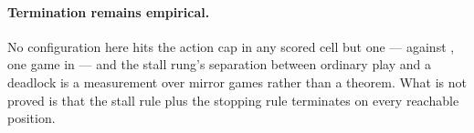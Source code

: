 \paragraph{Termination remains empirical.}
No configuration here hits the action cap in any scored cell but one --- \vsevenLimitCellArm{}
against \texttt{\vsevenLimitCellOpp{}}, one game in \vsevenLimitCellGames{} --- and the
stall rung's separation between ordinary play and a deadlock is a measurement over
\vsevenStallMirrorGames{} mirror games rather than a theorem.
What is not proved is that the stall rule plus the stopping rule terminates on every reachable
position.
